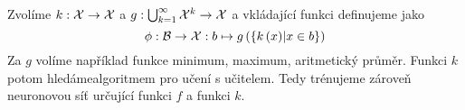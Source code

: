 Zvolíme \( k : \mathcal X \to \mathcal X \) a \( g : \bigcup_{k = 1}^{\infty} \mathcal X^k \to \mathcal X \) a vkládající funkci definujeme jako
\begin{equation}
	\phi : \mathcal B \to \mathcal X : b \mapsto g \left( \left\{ k \left( x \right) \middle| x \in b \right\} \right)
\end{equation}
Za \( g \) volíme například funkce minimum, maximum, aritmetický průměr. Funkci \( k \) potom hledámealgoritmem pro učení s učitelem. Tedy trénujeme zároveň neuronovou síť určující funkci \( f \) a funkci \( k \).
